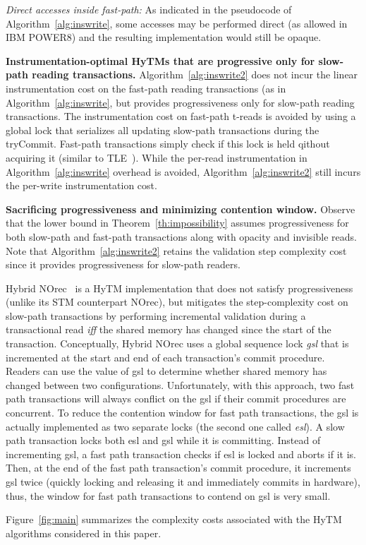 \vspace{1mm}\noindent\textit{Direct accesses inside fast-path:}
As indicated in the pseudocode of Algorithm~\ref{alg:inswrite}, some accesses may be performed direct (as allowed
in IBM POWER8) and the resulting implementation would still be opaque.

\vspace{1mm}\noindent\textbf{Instrumentation-optimal HyTMs that are progressive only for slow-path reading transactions.}
Algorithm~\ref{alg:inswrite2} does not incur the linear instrumentation cost
on the fast-path reading transactions (as in Algorithm~\ref{alg:inswrite}, but provides progressiveness only
for slow-path reading transactions. 
The instrumentation cost on fast-path t-reads is avoided by using a global lock that serializes all updating slow-path transactions
during the tryCommit. Fast-path transactions simply check if this lock is held qithout acquiring it (similar to TLE~\cite{tle}). While the per-read instrumentation in Algorithm~\ref{alg:inswrite}
overhead is avoided, Algorithm~\ref{alg:inswrite2} still incurs the per-write instrumentation cost.

\vspace{1mm}\noindent\textbf{Sacrificing progressiveness and minimizing contention window.}
Observe that the lower bound in Theorem~\ref{th:impossibility} assumes progressiveness for both slow-path and fast-path transactions
along with opacity and invisible reads. Note that Algorithm~\ref{alg:inswrite2} retains the validation step complexity cost since it provides progressiveness for slow-path readers.

Hybrid NOrec~\cite{hybridnorec} is a HyTM implementation that does not satisfy progressiveness
(unlike its STM counterpart NOrec), but mitigates
the step-complexity cost on slow-path transactions by performing incremental validation 
during a transactional read \emph{iff} 
the shared memory has changed since the start of the transaction.
Conceptually, Hybrid NOrec uses a global sequence lock \emph{gsl} that is incremented 
at the start and end of each transaction's commit procedure.
Readers can use the value of gsl to determine whether shared memory has changed between two configurations.
Unfortunately, with this approach, two fast path transactions will always conflict on the gsl if their 
commit procedures are concurrent.
To reduce the contention window for fast path transactions, the gsl is actually implemented as two separate locks (the second one called \emph{esl}).
A slow path transaction locks both esl and gsl while it is committing.
Instead of incrementing gsl, a fast path transaction checks if esl is locked and aborts if it is.
Then, at the end of the fast path transaction's commit procedure, 
it increments gsl twice (quickly locking and releasing it and immediately commits in hardware), thus, the 
window for fast path transactions to contend on gsl is very small.

Figure~\ref{fig:main} summarizes the complexity costs
associated with the HyTM algorithms considered in this paper.
%